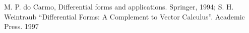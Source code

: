 \documentclass[12pt]{article}
\theoremstyle{definition}
\begin{document}
\tableofcontents

\newpage

\newpage

\newpage

\newpage

\newpage

\newpage

\newpage

\newpage

\newpage

\newpage

\newpage


\begin{thebibliography}{99}
	 M. P. do Carmo, Differential forms and applications. Springer, 1994;
	 S. H. Weintraub “Differential Forms: A Complement to Vector Calculus”. Academic Press. 1997
\end{thebibliography}
\end{document}
